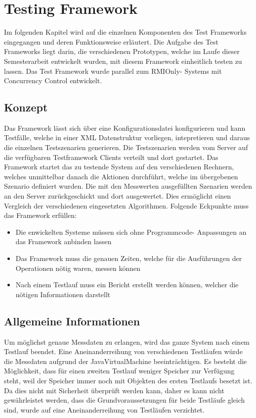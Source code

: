 \chapter{Testing Framework}
Im folgenden Kapitel wird auf die einzelnen Komponenten des Test Frameworks eingegangen und deren Funktionsweise erläutert. Die Aufgabe des Test Frameworks liegt darin, die verschiedenen Prototypen, welche im Laufe dieser Semesterarbeit entwickelt wurden, mit diesem Framework einheitlich testen zu lassen. Das Test Framework wurde parallel zum RMIOnly- Systems mit Concurrency Control entwickelt.

\section{Konzept}
Das Framework lässt sich über eine Konfigurationsdatei konfigurieren und kann Testfälle, welche in einer XML Datenstruktur vorliegen, intepretieren und daraus die einzelnen Testszenarien generieren. Die Testszenarien werden vom Server auf die verfügbaren Testframework Clients verteilt und dort gestartet. Das Framework startet das zu testende System auf den verschiedenen Rechnern, welches unmittelbar danach die Aktionen durchführt, welche im übergebenen Szenario definiert wurden.\newline
Die mit den Messwerten ausgefüllten Szenarien werden an den Server zurück\-geschickt und dort ausgewertet. Dies ermöglicht einen Vergleich der verschiedenen eingesetzten Algorithmen. Folgende Eckpunkte muss das Framework erfüllen:

\begin{itemize}
\item Die enwickelten Sys\-te\-me müssen sich ohne Programmcode- Anpassungen an das Framework anbinden lassen
\item Das Framework muss die genauen Zeiten, welche für die Ausführungen der Operationen nötig waren, messen können
\item Nach einem Testlauf muss ein Bericht erstellt werden können, welcher die nötigen Informationen darstellt
\end{itemize}

\section{Allgemeine Informationen}
\label{sec:allgInformationen}

Um möglichst genaue Messdaten zu erlangen, wird das ganze System nach einem Testlauf beendet. Eine Aneinanderreihung von verschiedenen Test\-läufen würde die Messdaten aufgrund der JavaVirtualMachine be\-ein\-träch\-ti\-gen. Es besteht die Möglichkeit, dass für einen zweiten Testlauf weniger Speicher zur Verfügung steht, weil der Speicher immer noch mit Objekten des ersten Testlaufs besetzt ist. Da dies nicht mit Sicherheit überprüft werden kann, daher es kann nicht gewährleistet werden, dass die Grundvoraussetzungen für beide Testläufe gleich sind, wurde auf eine Aneinanderreihung von Testläufen verzichtet.

